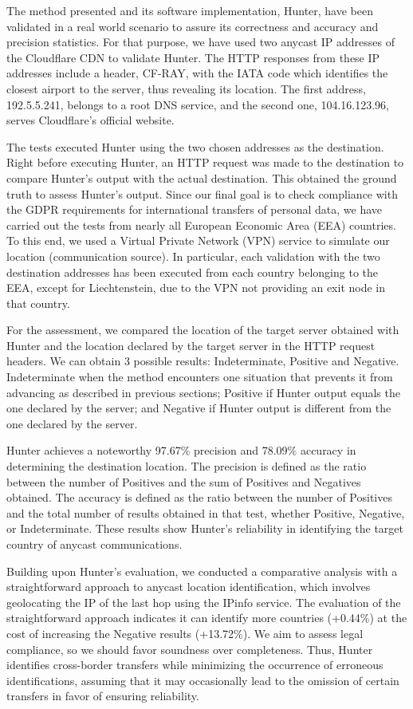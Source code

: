 The method presented and its software implementation, Hunter, have been validated in a real world scenario to assure its correctness and accuracy and precision statistics. For that purpose, we have used two anycast IP addresses of the Cloudflare CDN to validate Hunter. The HTTP responses from these IP addresses include a header, CF-RAY, with the IATA code which identifies the closest airport to the server, thus revealing its location. The first address, 192.5.5.241, belongs to a root DNS service, and the second one, 104.16.123.96, serves Cloudflare's official website.

The tests executed Hunter using the two chosen addresses as the destination. Right before executing Hunter, an HTTP request was made to the destination to compare Hunter's output with the actual destination. This obtained the ground truth to assess Hunter's output. Since our final goal is to check compliance with the GDPR requirements for international transfers of personal data, we have carried out the tests from nearly all European Economic Area (EEA) countries. To this end, we used a Virtual Private Network (VPN) service to simulate our location (communication source). In particular, each validation with the two destination addresses has been executed from each country belonging to the EEA, except for Liechtenstein, due to the VPN not providing an exit node in that country.

For the assessment, we compared the location of the target server obtained with Hunter and the location declared by the target server in the HTTP request headers. We can obtain 3 possible results: Indeterminate, Positive and Negative. Indeterminate when the method encounters one situation that prevents it from advancing as described in previous sections; Positive if Hunter output equals the one declared by the server; and Negative if Hunter output is different from the one declared by the server. 

Hunter achieves a noteworthy 97.67\% precision and 78.09\% accuracy in determining the destination location. The precision is defined as the ratio between the number of Positives and the sum of Positives and Negatives obtained. The accuracy is defined as the ratio between the number of Positives and the total number of results obtained in that test, whether Positive, Negative, or Indeterminate. These results show Hunter's reliability in identifying the target country of anycast communications.

Building upon Hunter's evaluation, we conducted a comparative analysis with a straightforward approach to anycast location identification, which involves geolocating the IP of the last hop using the IPinfo service. The evaluation of the straightforward approach indicates it can identify more countries (+0.44\%) at the cost of increasing the Negative results (+13.72\%). We aim to assess legal compliance, so we should favor soundness over completeness. Thus, Hunter identifies cross-border transfers while minimizing the occurrence of erroneous identifications, assuming that it may occasionally lead to the omission of certain transfers in favor of ensuring reliability.

